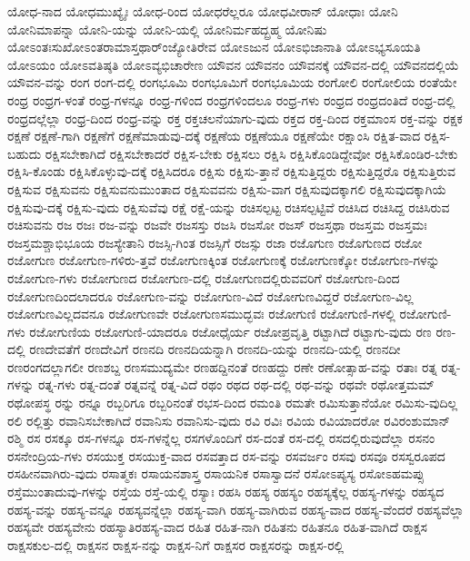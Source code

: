 {ಯೋಧ-ನಾದ
ಯೋಧಮುಖ್ಯೈಃ
ಯೋಧ-ರಿಂದ
ಯೋಧರೆಲ್ಲರೂ
ಯೋಧವೀರಾನ್
ಯೋಧಾಃ
ಯೋನಿ
ಯೋನಿಮಾಪನ್ನಾ
ಯೋನಿ-ಯನ್ನು
ಯೋನಿ-ಯಲ್ಲಿ
ಯೋನಿರ್ಮಹದ್ಬ್ರಹ್ಮ
ಯೋನಿಷು
ಯೋಽಂತಃಸುಖೋಽಂತರಾಮಾಸ್ತಥಾರ್ಂಜ್ಯೋತಿರೇವ
ಯೋಽಜುನ
ಯೋಽಭಿಜಾನಾತಿ
ಯೋಽಭ್ಯಸೂಯತಿ
ಯೋಽಯಂ
ಯೋಽವತಿಷ್ಠತಿ
ಯೋಽವ್ಯಭಿಚಾರೇಣ
ಯೌವನ
ಯೌವನಂ
ಯೌವನಕ್ಕೆ
ಯೌವನ-ದಲ್ಲಿ
ಯೌವನದಲ್ಲಿಯೆ
ಯೌವನ-ವನ್ನು
ರಂಗ
ರಂಗ-ದಲ್ಲಿ
ರಂಗಭೂಮಿ
ರಂಗಭೂಮಿಗೆ
ರಂಗಭೂಮಿಯ
ರಂಗೋಲಿ
ರಂಗೋಲಿಯ
ರಂತೆಯೇ
ರಂಧ್ರ
ರಂಧ್ರಗ-ಳಂತೆ
ರಂಧ್ರ-ಗಳನ್ನೂ
ರಂಧ್ರ-ಗಳಿಂದ
ರಂಧ್ರಗಳಿಂದಲೂ
ರಂಧ್ರ-ಗಳು
ರಂಧ್ರದ
ರಂಧ್ರದಂತಿದೆ
ರಂಧ್ರ-ದಲ್ಲಿ
ರಂಧ್ರದಲ್ಲೆಲ್ಲಾ
ರಂಧ್ರ-ದಿಂದ
ರಂಧ್ರ-ವನ್ನು
ರಕ್ತ
ರಕ್ತಚಲನೆಯಾಗು-ವುದು
ರಕ್ತದ
ರಕ್ತ-ದಿಂದ
ರಕ್ತಮಾಂಸ
ರಕ್ತ-ವನ್ನು
ರಕ್ಷಕ
ರಕ್ಷಣೆ
ರಕ್ಷಣೆ-ಗಾಗಿ
ರಕ್ಷಣೆಗೆ
ರಕ್ಷಣೆಮಾಡುವು-ದಕ್ಕೆ
ರಕ್ಷಣೆಯ
ರಕ್ಷಣೆಯೂ
ರಕ್ಷಣೆಯೇ
ರಕ್ಷಾಂಸಿ
ರಕ್ಷಿತ-ವಾದ
ರಕ್ಷಿಸ-ಬಹುದು
ರಕ್ಷಿಸಬೇಕಾಗಿದೆ
ರಕ್ಷಿಸಬೇಕಾದರೆ
ರಕ್ಷಿಸ-ಬೇಕು
ರಕ್ಷಿಸಲು
ರಕ್ಷಿಸಿ
ರಕ್ಷಿಸಿಕೊಂಡಿದ್ದೇವೋ
ರಕ್ಷಿಸಿಕೊಂಡಿರ-ಬೇಕು
ರಕ್ಷಿಸಿ-ಕೊಂಡು
ರಕ್ಷಿಸಿಕೊಳ್ಳುವು-ದಕ್ಕೆ
ರಕ್ಷಿಸಿದರೂ
ರಕ್ಷಿಸು
ರಕ್ಷಿಸು-ತ್ತಾನೆ
ರಕ್ಷಿಸುತ್ತಿದ್ದರು
ರಕ್ಷಿಸುತ್ತಿದ್ದರೊ
ರಕ್ಷಿಸುತ್ತಿರುವ
ರಕ್ಷಿಸುವ
ರಕ್ಷಿಸುವನು
ರಕ್ಷಿಸುವನುಮುಂತಾದ
ರಕ್ಷಿಸುವವನು
ರಕ್ಷಿಸು-ವಾಗ
ರಕ್ಷಿಸುವುದಕ್ಕಾಗಲಿ
ರಕ್ಷಿಸುವುದಕ್ಕಾಗಿಯೆ
ರಕ್ಷಿಸುವು-ದಕ್ಕೆ
ರಕ್ಷಿಸು-ವುದು
ರಕ್ಷಿಸುವೆವು
ರಕ್ಷೆ
ರಕ್ಷೆ-ಯನ್ನು
ರಚಿಸಲ್ಪಟ್ಟ
ರಚಿಸಲ್ಪಟ್ಟಿವೆ
ರಚಿಸಿದ
ರಚಿಸಿದ್ದ
ರಚಿಸಿರುವ
ರಚಿಸುವನು
ರಜ
ರಜಃ
ರಜ-ವನ್ನು
ರಜವೇ
ರಜಸಸ್ತು
ರಜಸಿ
ರಜಸೋ
ರಜಸ್
ರಜಸ್ತಥಾ
ರಜಸ್ತಮ
ರಜಸ್ತಮಃ
ರಜಸ್ತಮಶ್ಚಾಭಿಭೂಯ
ರಜಸ್ಯೇತಾನಿ
ರಜಸ್ಸಿ-ಗಿಂತ
ರಜಸ್ಸಿಗೆ
ರಜಸ್ಸು
ರಜಾ
ರಜೊಗುಣ
ರಜೊಗುಣದ
ರಜೋ
ರಜೋಗುಣ
ರಜೋಗುಣ-ಗಳಿರು-ತ್ತವೆ
ರಜೋಗುಣಕ್ಕಿಂತ
ರಜೋಗುಣಕ್ಕೆ
ರಜೋಗುಣಕ್ಕೋ
ರಜೋಗುಣ-ಗಳನ್ನು
ರಜೋಗುಣ-ಗಳು
ರಜೋಗುಣದ
ರಜೋಗುಣ-ದಲ್ಲಿ
ರಜೋಗುಣದಲ್ಲಿರುವವರಿಗೆ
ರಜೋಗುಣ-ದಿಂದ
ರಜೋಗುಣದಿಂದಲಾದರೂ
ರಜೋಗುಣ-ವನ್ನು
ರಜೋಗುಣ-ವಿದೆ
ರಜೋಗುಣವಿದ್ದರೆ
ರಜೋಗುಣ-ವಿಲ್ಲ
ರಜೋಗುಣವಿಲ್ಲದವನೂ
ರಜೋಗುಣವೇ
ರಜೋಗುಣಸಮುದ್ಭವಃ
ರಜೋಗುಣಿ
ರಜೋಗುಣಿ-ಗಳಲ್ಲಿ
ರಜೋಗುಣಿ-ಗಳು
ರಜೋಗುಣಿಯ
ರಜೋಗುಣಿ-ಯಾದರೂ
ರಜೋಧೈರ್ಯ
ರಜೋಪ್ರವೃತ್ತಿ
ರಟ್ಟಾಗಿದೆ
ರಟ್ಟಾಗು-ವುದು
ರಣ
ರಣ-ದಲ್ಲಿ
ರಣದೇವತೆಗೆ
ರಣದೇವಿಗೆ
ರಣನದಿ
ರಣನದಿಯನ್ನಾಗಿ
ರಣನದಿ-ಯನ್ನು
ರಣನದಿ-ಯಲ್ಲಿ
ರಣನದೀ
ರಣರಂಗದಲ್ಲಾಗಲೀ
ರಣಶಬ್ದ
ರಣಸಮುದ್ಯಮೇ
ರಣಹದ್ದಿನಂತೆ
ರಣಹದ್ದು
ರಣೇ
ರಣೋತ್ಸಾಹ-ವನ್ನು
ರತಾಃ
ರತ್ನ
ರತ್ನ-ಗಳನ್ನು
ರತ್ನ-ಗಳು
ರತ್ನ-ದಂತೆ
ರತ್ನವನ್ನೆ
ರತ್ನ-ವಿದೆ
ರಥಂ
ರಥದ
ರಥ-ದಲ್ಲಿ
ರಥ-ವನ್ನು
ರಥವೇ
ರಥೋತ್ತಮಮ್
ರಥೋಪಸ್ಥ
ರನ್ನು
ರನ್ನೂ
ರಬ್ಬರಿಗೂ
ರಬ್ಬರಿನಂತೆ
ರಭಸ-ದಿಂದ
ರಮಂತಿ
ರಮತೇ
ರಮಿಸುತ್ತಾನೆಯೋ
ರಮಿಸು-ವುದಿಲ್ಲ
ರಲಿ
ರಲ್ಲಿತ್ತು
ರವಾನಿಸಬೇಕಾಗಿದೆ
ರವಾನಿಸು
ರವಾನಿಸು-ವುದು
ರವಿ
ರವಿಃ
ರವಿಯ
ರವಿಯಾದರೋ
ರವಿರಂಶುಮಾನ್
ರಶ್ಮಿ
ರಸ
ರಸಕ್ಕೂ
ರಸ-ಗಳನ್ನೂ
ರಸ-ಗಳನ್ನೆಲ್ಲ
ರಸಗಳೊಂದಿಗೆ
ರಸ-ದಂತೆ
ರಸ-ದಲ್ಲಿ
ರಸದಲ್ಲಿರುವುದೆಲ್ಲಾ
ರಸನಂ
ರಸನೇಂದ್ರಿಯ-ಗಳು
ರಸಯುಕ್ತ
ರಸಯುಕ್ತ-ವಾದ
ರಸವತ್ತಾದ
ರಸ-ವನ್ನು
ರಸವರ್ಜಂ
ರಸವು
ರಸವೂ
ರಸಸ್ವರೂಪದ
ರಸಹೀನವಾಗಿರು-ವುದು
ರಸಾತ್ಮಕಃ
ರಸಾಯನಶಾಸ್ತ್ರ
ರಸಾಯನಿಕ
ರಸಾಸ್ವಾದನೆ
ರಸೋಽಪ್ಯಸ್ಯ
ರಸೋಽಹಮಪ್ಸು
ರಸ್ತೆಮುಂತಾದುವು-ಗಳನ್ನು
ರಸ್ತೆಯ
ರಸ್ತೆ-ಯಲ್ಲಿ
ರಸ್ಯಾಃ
ರಹಸಿ
ರಹಸ್ಯ
ರಹಸ್ಯಂ
ರಹಸ್ಯಕ್ಕೆಲ್ಲ
ರಹಸ್ಯ-ಗಳನ್ನು
ರಹಸ್ಯದ
ರಹಸ್ಯ-ವನ್ನು
ರಹಸ್ಯ-ವನ್ನೂ
ರಹಸ್ಯವನ್ನೆಲ್ಲಾ
ರಹಸ್ಯ-ವಾಗಿ
ರಹಸ್ಯ-ವಾಗಿರುವ
ರಹಸ್ಯ-ವಾದ
ರಹಸ್ಯ-ವೆಂದರೆ
ರಹಸ್ಯವೆಲ್ಲಾ
ರಹಸ್ಯವೇ
ರಹಸ್ಯವೇನು
ರಹಸ್ಯಾತಿರಹಸ್ಯ-ವಾದ
ರಹಿತ
ರಹಿತ-ನಾಗಿ
ರಹಿತನು
ರಹಿತನೂ
ರಹಿತ-ವಾಗಿದೆ
ರಾಕ್ಷಸ
ರಾಕ್ಷಸಕುಲ-ದಲ್ಲಿ
ರಾಕ್ಷಸನ
ರಾಕ್ಷಸ-ನನ್ನು
ರಾಕ್ಷಸ-ನಿಗೆ
ರಾಕ್ಷಸರ
ರಾಕ್ಷಸರನ್ನು
ರಾಕ್ಷಸ-ರಲ್ಲಿ
}
